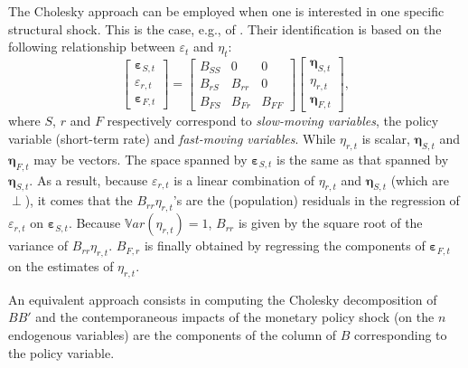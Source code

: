 \documentclass[
  12pt,
]{book}
\theoremstyle{definition}
\theoremstyle{definition}
\theoremstyle{definition}
\theoremstyle{definition}
\theoremstyle{remark}
\begin{document}
The Cholesky approach can be employed when one is interested in one specific structural shock. This is the case, e.g., of \citet{Christiano_Eichenbaum_Evans_1996}. Their identification is based on the following relationship between \(\varepsilon_t\) and \(\eta_t\):
\[
\left[\begin{array}{c}
\boldsymbol\varepsilon_{S,t}\\
\varepsilon_{r,t}\\
\boldsymbol\varepsilon_{F,t}
\end{array}\right] =
\left[\begin{array}{ccc}
B_{SS} & 0 & 0 \\
B_{rS} & B_{rr} & 0 \\
B_{FS} & B_{Fr} & B_{FF}
\end{array}\right]
\left[\begin{array}{c}
\boldsymbol\eta_{S,t}\\
\eta_{r,t}\\
\boldsymbol\eta_{F,t}
\end{array}\right],
\]
where \(S\), \(r\) and \(F\) respectively correspond to \emph{slow-moving variables}, the policy variable (short-term rate) and \emph{fast-moving variables}. While \(\eta_{r,t}\) is scalar, \(\boldsymbol\eta_{S,t}\) and \(\boldsymbol\eta_{F,t}\) may be vectors. The space spanned by \(\boldsymbol\varepsilon_{S,t}\) is the same as that spanned by \(\boldsymbol\eta_{S,t}\). As a result, because \(\varepsilon_{r,t}\) is a linear combination of \(\eta_{r,t}\) and \(\boldsymbol\eta_{S,t}\) (which are \(\perp\)), it comes that the \(B_{rr}\eta_{r,t}\)'s are the (population) residuals in the regression of \(\varepsilon_{r,t}\) on \(\boldsymbol\varepsilon_{S,t}\). Because \(\mathbb{V}ar(\eta_{r,t})=1\), \(B_{rr}\) is given by the square root of the variance of \(B_{rr}\eta_{r,t}\). \(B_{F,r}\) is finally obtained by regressing the components of \(\boldsymbol\varepsilon_{F,t}\) on the estimates of \(\eta_{r,t}\).

An equivalent approach consists in computing the Cholesky decomposition of \(BB'\) and the contemporaneous impacts of the monetary policy shock (on the \(n\) endogenous variables) are the components of the column of \(B\) corresponding to the policy variable.
\end{document}
